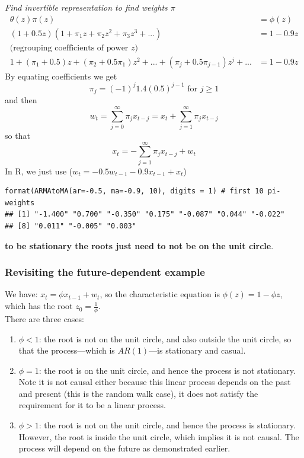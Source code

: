 \documentclass[11pt]{article}
\newcommand{\noi}{\noindent}
\begin{document}
\noi \textit{Find invertible representation to find weights $\pi$}
\begin{align*}
    \theta(z)\pi(z) &= \phi(z) \\
    (1+0.5z)(1+\pi_1z + \pi_2z^2 + \pi_3z^3 + ...) &= 1 - 0.9z \\
    \text{(regrouping coefficients of power $z$)}& \\
    1 + (\pi_1 + 0.5)z + (\pi_2 + 0.5\pi_1)z^2 + ... + (\pi_j + 0.5\pi_{j-1})z^j + ... &= 1 - 0.9z
\end{align*}
\noi By equating coefficients we get
$$\pi_j = (-1)^j1.4(0.5)^{j-1} \text{ for } j \geq 1$$
\noi and then
$$w_t = \sum_{j=0}^{\infty}{\pi_jx_{t-j}} = x_t + \sum_{j=1}^{\infty}{\pi_j x_{t-j}}$$
\noi so that
$$x_t = -\sum_{j=1}^{\infty}{\pi_jx_{t-j}} + w_t$$
\noi In R, we just use ($w_t = -0.5w_{t-1} - 0.9x_{t-1} + x_t$)
\begin{lstlisting}
format(ARMAtoMA(ar=-0.5, ma=-0.9, 10), digits = 1) # first 10 pi-weights
## [1] "-1.400" "0.700" "-0.350" "0.175" "-0.087" "0.044" "-0.022"
## [8] "0.011" "-0.005" "0.003"
\end{lstlisting}

\noi \textbf{to be stationary the roots just need to not be on the unit circle}.

\subsubsection*{Revisiting the future-dependent example}
\noi We have: $x_t = \phi x_{t-1} + w_t$, so the characteristic equation is $\phi(z) = 1 - \phi z$, which has the root $z_0 = \frac{1}{\phi}$. \\

\noi There are three cases:
\begin{enumerate}
    \item $\phi < 1$: the root is not on the unit circle, and also outside the unit circle, so that the process---which is $AR(1)$---is stationary and casual.
    \item $\phi = 1$: the root is on the unit circle, and hence the process is not stationary. Note it is not causal either because this linear process depends on the past and present (this is the random walk case), it does not satisfy the requirement for it to be a linear process.
    \item $\phi > 1$: the root is not on the unit circle, and hence the process is stationary. However, the root is inside the unit circle, which implies it is not causal. The process will depend on the future as demonstrated earlier.
\end{enumerate}
\end{document}
